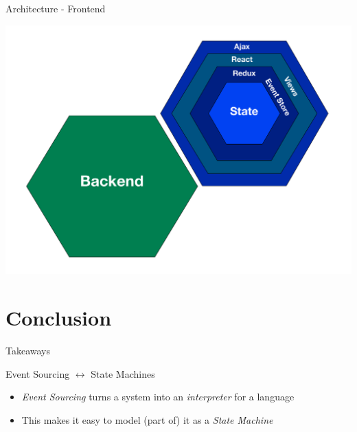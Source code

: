 \begin{frame}[fragile]{Architecture - Frontend}
  \begin{center}
    \includegraphics[height=.8\textheight]{./images/archi-front.pdf}
  \end{center}
\end{frame}


\part{Conclusion}

\begin{frame}[fragile]{Takeaways}
\end{frame}

\begin{frame}[fragile]{Event Sourcing $\leftrightarrow$ State Machines}
  \begin{itemize}[<+->]
  \item \emph{Event Sourcing} turns a system into an \emph{interpreter} for a language
  \item This makes it easy to model (part of) it as a \emph{State Machine}
  \end{itemize}
\end{frame}

